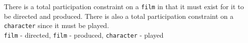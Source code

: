 \begin{parts}
  \begin{solution}
    There is a total participation constraint on a \texttt{film} in that
    it must exist for it to be directed and produced. There is also a total
    participation constraint on a \texttt{character} since it must be played.\\
    \texttt{film} - directed, \texttt{film} - produced, 
    \texttt{character} - played
  \end{solution}

\end{parts}

